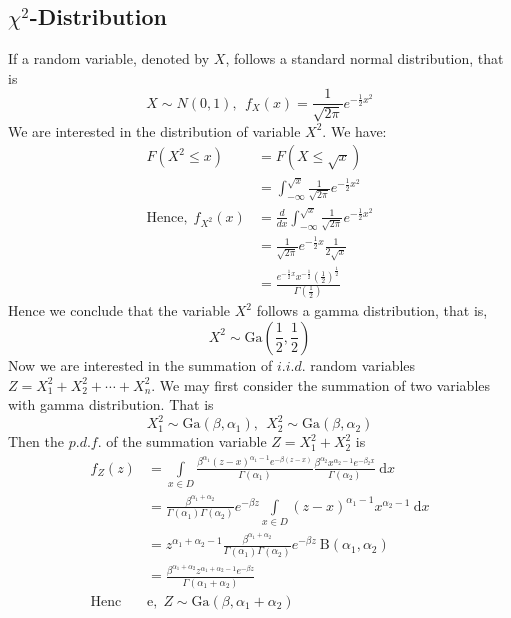 \documentclass[16pt]{article}
\begin{document}
\subsection{$\chi^2$-Distribution}
If a random variable, denoted by $X$, follows a standard normal distribution, that is
\begin{equation}
    X \sim N(0,1),~~f_X(x) = \frac{1}{\sqrt{2\pi}}e^{-\frac{1}{2}x^2}
\end{equation}
We are interested in the distribution of variable $X^2$. We have:
\begin{equation}
\begin{aligned}
    F(X^2\leq x) &= F(X\leq \sqrt{x})\\
    &= \int^{\sqrt{x}}_{-\infty} \frac{1}{\sqrt{2\pi}}e^{-\frac{1}{2}x^2}\\
    \text{Hence,}~~f_{X^2}(x) &= \frac{d}{dx}\int^{\sqrt{x}}_{-\infty} \frac{1}{\sqrt{2\pi}}e^{-\frac{1}{2}x^2}\\
    &= \frac{1}{\sqrt{2\pi}} e^{-\frac{1}{2}x} \frac{1}{2\sqrt{x}} \\
    &= \frac{e^{-\frac{1}{2}x} x^{-\frac{1}{2}} (\frac{1}{2})^{\frac{1}{2}}}{\Gamma(\frac{1}{2})}
\end{aligned}
\end{equation}
Hence we conclude that the variable $X^2$ follows a gamma distribution, that is,
\begin{equation}
    X^2 \sim \text{Ga}(\frac{1}{2},\frac{1}{2})
\end{equation}
Now we are interested in the summation of $i.i.d.$ random variables $Z = X_1^2 + X_2^2 + \cdots + X_n^2$.
We may first consider the summation of two variables with gamma distribution. That is
\begin{equation}
    X_1^2 \sim \text{Ga}(\beta, \alpha_1),~~X_2^2 \sim \text{Ga}(\beta,\alpha_2)
\end{equation}
Then the $p.d.f.$ of the summation variable $Z = X_1^2 + X_2^2$ is
\begin{equation}
\begin{aligned}
    f_Z(z)&=\int \limits_{x\in D}\frac{\beta^{\alpha_1}(z-x)^{\alpha_1-1} e^{-\beta(z-x)}}{\Gamma(\alpha_1)} \frac{\beta^{\alpha_2}x^{\alpha_2-1}e^{-\beta_2x}}{\Gamma(\alpha_2)}~\text{d}x\\
    &=\frac{\beta^{\alpha_1+\alpha_2}}{\Gamma(\alpha_1)\Gamma(\alpha_2)} e^{-\beta z}\int \limits_{x\in D} (z-x)^{\alpha_1-1} x^{\alpha_2-1}~\text{d}x\\
    &= z^{\alpha_1+\alpha_2-1}\frac{\beta^{\alpha_1+\alpha_2}}{\Gamma(\alpha_1)\Gamma(\alpha_2)} e^{-\beta z} ~\text{B}(\alpha_1,\alpha_2) \\
    &= \frac{\beta^{\alpha_1+\alpha_2} z^{\alpha_1+\alpha_2-1}e^{-\beta z}}{\Gamma(\alpha_1+\alpha_2)} \\
    \text{Henc}&\text{e,}~~Z \sim \text{Ga}(\beta, \alpha_1+\alpha_2)
\end{aligned}
\end{equation}
\end{document}
